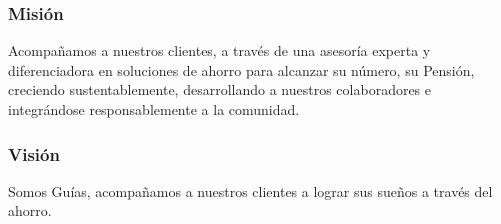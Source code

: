 \subsubsection{Misión}
Acompañamos a nuestros clientes, a través de una asesoría experta y diferenciadora en soluciones de ahorro para alcanzar su número, su Pensión, creciendo sustentablemente, desarrollando a nuestros colaboradores e integrándose responsablemente a la comunidad. 

\subsubsection{Visión}
Somos Guías, acompañamos a nuestros clientes a lograr sus sueños a través del ahorro. 
